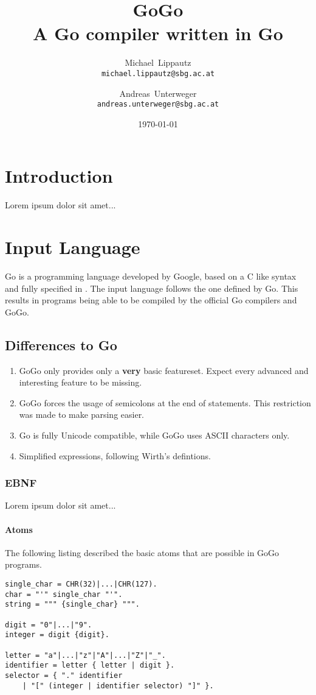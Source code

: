 \documentclass[a4paper]{scrreprt}
\title{GoGo\\ \large{A Go compiler written in Go}}
\author{
  Michael~Lippautz \\ \normalsize{\texttt{michael.lippautz@sbg.ac.at}} 
    \and 
  Andreas~Unterweger \\ \normalsize{\texttt{andreas.unterweger@sbg.ac.at}} 
}
\date{\today}
\begin{document}
  \maketitle
  \tableofcontents

  \chapter{Introduction}
    Lorem ipsum dolor sit amet...

  \chapter{Input Language}
    Go is a programming language developed by Google, based on a C like syntax and fully specified in \cite{goo10}. The input language follows the one defined by Go. This results in programs being able to be compiled by the official Go compilers and GoGo.

    \section{Differences to Go}
      \begin{enumerate}
        \item GoGo only provides only a \textbf{very} basic featureset. Expect every advanced and interesting feature to be missing.
        \item GoGo forces the usage of semicolons at the end of statements. This restriction was made to make parsing easier.
        \item Go is fully Unicode compatible, while GoGo uses ASCII characters only.
        \item Simplified expressions, following Wirth's \cite{wir96} defintions.
      \end{enumerate}

    \subsection{EBNF}
      Lorem ipsum dolor sit amet...

      \subsubsection{Atoms}
        The following listing described the basic atoms that are possible in GoGo programs.

        \begin{lstlisting}[caption=Atoms]
single_char = CHR(32)|...|CHR(127).
char = "'" single_char "'".
string = """ {single_char} """.

digit = "0"|...|"9".	
integer = digit {digit}.

letter = "a"|...|"z"|"A"|...|"Z"|"_".
identifier = letter { letter | digit }.
selector = { "." identifier 
    | "[" (integer | identifier selector) "]" }.
        \end{lstlisting}
\end{document}
